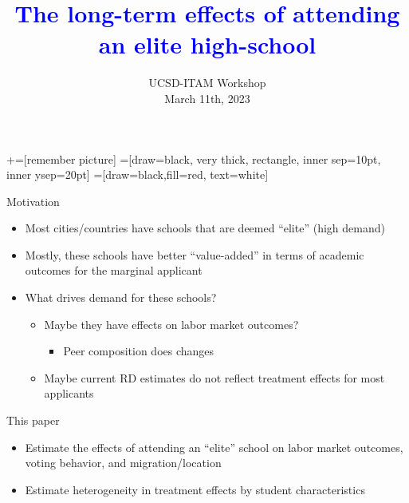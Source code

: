 \documentclass[notes,11pt, aspectratio=169]{beamer}
\title[]{\textcolor{blue}{The long-term effects of attending an elite high-school}}
\author[Marco Medina]{}
\institute[FRBNY]{\small{\begin{tabular}{c c c c c}
Mauricio Romero &&  Enrique Seira && Rafael de Hoyos   \\
ITAM && ITAM/MSU && World Bank \\ \\

\end{tabular}}}
\date{UCSD-ITAM Workshop \\ March 11th, 2023}
\begin{document}
\newcommand\marktopleft[1]{%
    \tikz[overlay,remember picture] 
        \node (marker-#1-a) at (-.3em,.3em) {};%
}
\newcommand\markbottomright[2]{%
    \tikz[overlay,remember picture] 
        \node (marker-#1-b) at (0em,0em) {};%
}
+=[remember picture] 
 =[draw=black, very thick, rectangle, inner sep=10pt, inner ysep=20pt]
 =[draw=black,fill=red, text=white]

\begin{frame}
\maketitle
\end{frame}

\begin{frame}[fragile]{Motivation}
  \begin{itemize}[<+->]
    \vfill\item Most cities/countries have schools that are deemed ``elite'' (high demand)
    \vfill\item Mostly, these schools  have better ``value-added'' in terms of academic outcomes for the marginal applicant \tiny{\citep{Adrienne2014,ElliteIllusion,DobbieFryer2014,dustan2017flourish,ParentsValueEffectiveness}}
\vfill\item What drives demand for these schools?
  \begin{itemize}
    \vfill\item Maybe they have effects on labor market outcomes?
      \begin{itemize}
     \vfill\item Peer composition does changes \tiny{\citep{ElliteIllusion,DobbieFryer2014,ParentsValueEffectiveness}}
       \end{itemize}
    \vfill\item Maybe current RD estimates do not reflect treatment effects for most applicants
  \end{itemize}
    \end{itemize}
\end{frame}

\begin{frame}[fragile]{This paper}
  \begin{itemize}
    \vfill\item Estimate the effects of attending an ``elite'' school on labor market outcomes, voting behavior, and migration/location
    \vfill\item Estimate heterogeneity in treatment effects by student characteristics
    \end{itemize}
\end{frame}
\end{document}
